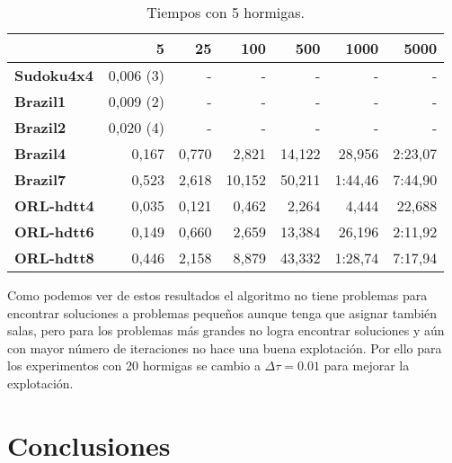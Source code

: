 \documentclass[letter, 10pt]{article}
\renewcommand{\bf}[1]{\textbf{#1}}
\begin{document}
\begin{table}[h]
\centering
\begin{tabular}{|l|r|r|r|r|r|r|}
  \hline
                 & 5         & 25     & 100    & 500    & 1000    & 5000     \\\hline
  \bf{Sudoku4x4} & 0,006 (3) & -      & -      & -      & -       & -        \\\hline
  \bf{Brazil1}   & 0,009 (2) & -      & -      & -      & -       & -        \\\hline
  \bf{Brazil2}   & 0,020 (4) & -      & -      & -      & -       & -        \\\hline
  \bf{Brazil4}   & 0,167     & 0,770  & 2,821  & 14,122 & 28,956  & 2:23,07  \\\hline
  \bf{Brazil7}   & 0,523     & 2,618  & 10,152 & 50,211 & 1:44,46 & 7:44,90  \\\hline
  \bf{ORL-hdtt4} & 0,035     & 0,121  & 0,462  & 2,264  & 4,444   & 22,688   \\\hline
  \bf{ORL-hdtt6} & 0,149     & 0,660  & 2,659  & 13,384 & 26,196  & 2:11,92  \\\hline
  \bf{ORL-hdtt8} & 0,446     & 2,158  & 8,879  & 43,332 & 1:28,74 & 7:17,94  \\\hline
\end{tabular}
\caption{Tiempos con 5 hormigas.}\label{tab:5ants:time}
\end{table}

Como podemos ver de estos resultados el algoritmo no tiene problemas para
encontrar soluciones a problemas pequeños aunque tenga que asignar también
salas, pero para los problemas más grandes no logra encontrar soluciones y aún
con mayor número de iteraciones no hace una buena explotación. Por ello para los
experimentos con 20 hormigas se cambio a $\Delta\tau = 0.01$ para mejorar la
explotación.

\section{Conclusiones}\label{sec:conc}



\end{document}
